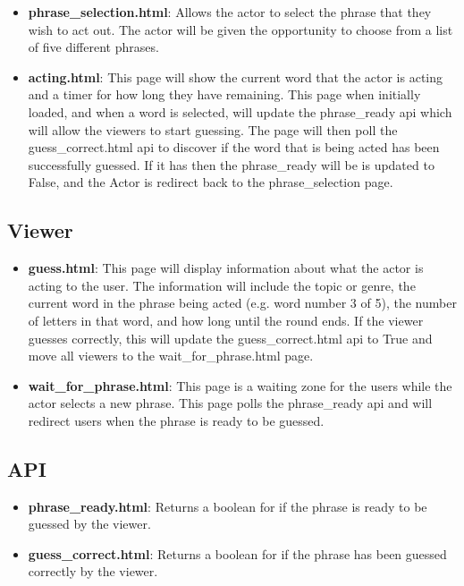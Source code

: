 \documentclass{article}
\begin{document}
\begin{itemize}
	\item \textbf{phrase\_selection.html}: Allows the actor to select the phrase that they wish to act out. The actor will be given the opportunity to choose from a list of five different phrases.
	
	\item \textbf{acting.html}: This page will show the current word that the actor is acting and a timer for how long they have remaining. This page when initially loaded, and when a word is selected, will update the phrase\_ready api which will allow the viewers to start guessing. The page will then poll the guess\_correct.html api to discover if the word that is being acted has been successfully guessed. If it has then the phrase\_ready will be is updated to False, and the Actor is redirect back to the phrase\_selection page. 
	
\end{itemize}


\subsection{Viewer}

\begin{itemize}
	\item \textbf{guess.html}: This page will display information about what the actor is acting to the user. The information will include the topic or genre, the current word in the phrase being acted (e.g. word number 3 of 5), the number of letters in that word, and how long until the round ends. If the viewer guesses correctly, this will update the guess\_correct.html api to True and move all viewers to the wait\_for\_phrase.html page.
	
	\item \textbf{wait\_for\_phrase.html}: This page is a waiting zone for the users while the actor selects a new phrase. This page polls the phrase\_ready api and will redirect users when the phrase is ready to be guessed.
	
\end{itemize}

\subsection{API}

\begin{itemize}

	\item \textbf{phrase\_ready.html}: Returns a boolean for if the phrase is ready to be guessed by the viewer.
	
	\item \textbf{guess\_correct.html}: Returns a boolean for if the phrase has been guessed correctly by the viewer.

\end{itemize}
 
\end{document}
